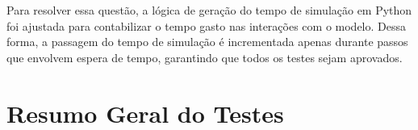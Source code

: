 Para resolver essa questão, a lógica de geração do tempo de simulação em Python foi ajustada para contabilizar o tempo gasto nas interações com o modelo. Dessa forma, 
a passagem do tempo de simulação é incrementada apenas durante passos que envolvem espera de tempo, garantindo que todos os testes sejam aprovados.

\chapter{Resumo Geral do Testes}

